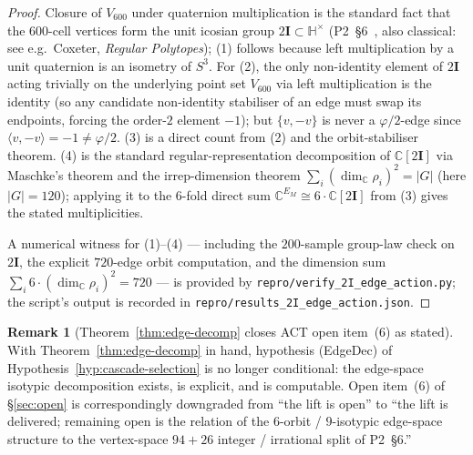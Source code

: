 \documentclass[11pt]{article}
\theoremstyle{definition}
\newtheorem{remark}[theorem]{Remark}
\newcommand{\C}{\mathbb{C}}
\newcommand{\HH}{\mathbb{H}}
\newcommand{\twoI}{2\mathbf{I}}
\begin{document}
\begin{proof}[Proof]
Closure of $V_{600}$ under quaternion multiplication is the standard fact that the $600$-cell vertices form the unit icosian group $\twoI \subset \HH^\times$ (P2~\S 6~\citep{CascadeAlgSubstrate}, also classical: see e.g.\ Coxeter, \emph{Regular Polytopes}); (1) follows because left multiplication by a unit quaternion is an isometry of $S^3$. For (2), the only non-identity element of $\twoI$ acting trivially on the underlying point set $V_{600}$ via left multiplication is the identity (so any candidate non-identity stabiliser of an edge must swap its endpoints, forcing the order-$2$ element $-1$); but $\{v,-v\}$ is never a $\varphi/2$-edge since $\langle v, -v\rangle = -1 \neq \varphi/2$. (3) is a direct count from (2) and the orbit-stabiliser theorem. (4) is the standard regular-representation decomposition of $\C[\twoI]$ via Maschke's theorem and the irrep-dimension theorem $\sum_i (\dim_\C\rho_i)^2 = |G|$ (here $|G| = 120$); applying it to the $6$-fold direct sum $\C^{E_M} \cong 6\cdot\C[\twoI]$ from (3) gives the stated multiplicities.

A numerical witness for (1)--(4) --- including the $200$-sample group-law check on $\twoI$, the explicit $720$-edge orbit computation, and the dimension sum $\sum_i 6\cdot(\dim_\C\rho_i)^2 = 720$ --- is provided by \texttt{repro/verify\_2I\_edge\_action.py}; the script's output is recorded in \texttt{repro/results\_2I\_edge\_action.json}.
\end{proof}

\begin{remark}[Theorem~\ref{thm:edge-decomp} closes ACT open item~(6) as stated]\label{rem:edge-decomp-status}
With Theorem~\ref{thm:edge-decomp} in hand, hypothesis (EdgeDec) of Hypothesis~\ref{hyp:cascade-selection} is no longer conditional: the edge-space isotypic decomposition exists, is explicit, and is computable. Open item~(6) of \S\ref{sec:open} is correspondingly downgraded from ``the lift is open'' to ``the lift is delivered; remaining open is the relation of the $6$-orbit / $9$-isotypic edge-space structure to the vertex-space $94 + 26$ integer / irrational split of P2~\S 6.''
\end{remark}
\end{document}
